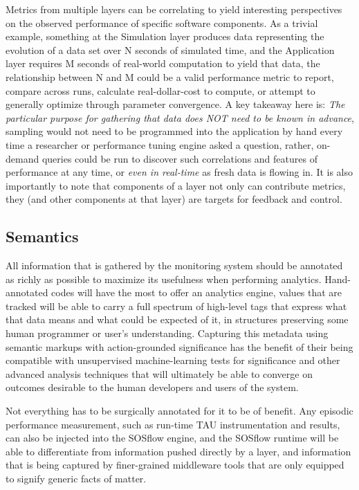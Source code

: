Metrics from multiple layers can be correlating to yield interesting
perspectives on the observed performance of specific software
components.  As a trivial example, something at the Simulation layer
produces data representing the evolution of a data set over N seconds
of simulated time, and the Application layer requires M seconds of
real-world computation to yield that data, the relationship between N
and M could be a valid performance metric to report, compare across
runs, calculate real-dollar-cost to compute, or attempt to generally
optimize through parameter convergence. A key takeaway here
is: \textit{The particular purpose for gathering that data does NOT
need to be known in advance}, sampling would not need to be programmed
into the application by hand every time a researcher or performance
tuning engine asked a question, rather, on-demand queries could be run
to discover such correlations and features of performance at any time,
or \textit{even in real-time} as fresh data is flowing in. It is also
importantly to note that components of a layer not only can contribute
metrics, they (and other components at that layer) are targets for
feedback and control.


\subsection{Semantics}

All information that is gathered by the monitoring system should be
annotated as richly as possible to maximize its usefulness when
performing analytics.  Hand-annotated codes will have the most to
offer an analytics engine, values that are tracked will be able to
carry a full spectrum of high-level tags that express what that data
means and what could be expected of it, in structures preserving
some human programmer or user's understanding. Capturing this metadata
using semantic markups with action-grounded significance has the
benefit of their being compatible with unsupervised machine-learning
tests for significance and other advanced analysis techniques that
will ultimately be able to converge on outcomes desirable to the human
developers and users of the system.

Not everything has to be surgically annotated for it to be of benefit.
Any episodic performance measurement, such as run-time TAU
instrumentation and results, can also be injected into the SOSflow engine, and the
SOSflow runtime will be able to differentiate from information pushed
directly by a layer, and information that is being captured by finer-grained
middleware tools that are only equipped to signify generic facts of matter.

